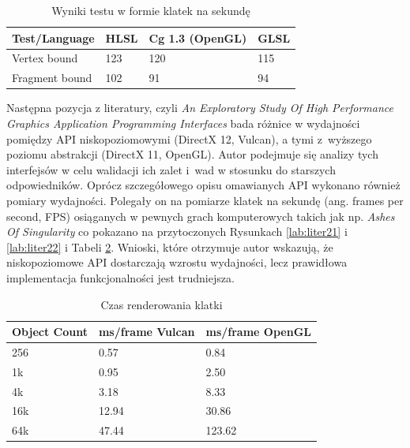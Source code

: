 \documentclass[archive]{mgr}
\begin{document}
\begin{table}[h!]

    \centering %
    \caption{Wyniki testu w formie klatek na sekundę}
    		\label{lab:tabLib1}
    \vspace{2mm} %
\begin{tabular}{|l|l|l|l|}
\hline
\textbf{Test/Language} & \textbf{HLSL} & \textbf{Cg 1.3 (OpenGL)}& \textbf{GLSL} \\ \hline
Vertex bound & 123 & 120 & 115 \\ \hline
Fragment bound & 102 & 91 & 94 \\ \hline
\end{tabular}
\end{table}



Następna pozycja z literatury, czyli \emph{An Exploratory Study Of High Performance Graphics Application Programming Interfaces} \cite{lit3} bada różnice w wydajności pomiędzy API niskopoziomowymi (DirectX 12, Vulcan), a tymi z~wyższego poziomu abstrakcji (DirectX 11, OpenGL). Autor podejmuje się analizy tych interfejsów w celu walidacji ich zalet i~wad w stosunku do starszych odpowiedników. Oprócz szczegółowego opisu omawianych API wykonano również pomiary wydajności. Polegały on na pomiarze klatek na sekundę (ang. frames per second, FPS) osiąganych w pewnych grach komputerowych takich jak np. \emph{Ashes Of Singularity}  co pokazano na przytoczonych Rysunkach \ref{lab:liter21} i \ref{lab:liter22} i Tabeli \ref{lab:tabLib2}. Wnioski, które otrzymuje autor wskazują, że niskopoziomowe API dostarczają wzrostu wydajności, lecz prawidłowa implementacja funkcjonalności jest trudniejsza. \\

\begin{table}[h!]

    \centering %
    \caption{Czas renderowania klatki}
    		\label{lab:tabLib2}
    \vspace{2mm} %
\begin{tabular}{|l|l|l|}
\hline
\textbf{Object Count} & \textbf{ms/frame Vulcan} & \textbf{ms/frame OpenGL}\\ \hline
256 & 0.57 & 0.84 \\ \hline
1k & 0.95 & 2.50 \\ \hline
4k & 3.18 & 8.33 \\ \hline
16k & 12.94 & 30.86 \\ \hline
64k & 47.44 & 123.62 \\ \hline
\end{tabular}
\end{table}
\end{document}
